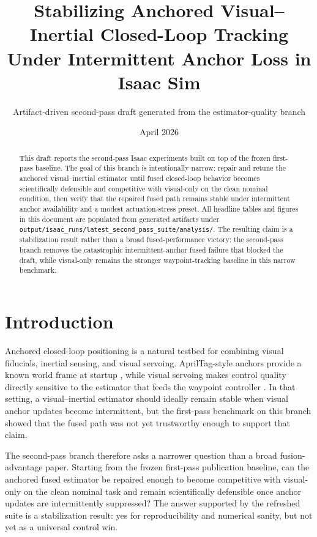 \documentclass[11pt]{article}
\title{Stabilizing Anchored Visual--Inertial Closed-Loop Tracking Under Intermittent Anchor Loss in Isaac Sim}
\author{Artifact-driven second-pass draft generated from the estimator-quality branch}
\date{April 2026}
\begin{document}
\maketitle

\begin{abstract}
This draft reports the second-pass Isaac experiments built on top of the frozen first-pass baseline. The goal of this branch is intentionally narrow: repair and retune the anchored visual--inertial estimator until fused closed-loop behavior becomes scientifically defensible and competitive with visual-only on the clean nominal condition, then verify that the repaired fused path remains stable under intermittent anchor availability and a modest actuation-stress preset. All headline tables and figures in this document are populated from generated artifacts under \texttt{output/isaac\_runs/latest\_second\_pass\_suite/analysis/}. The resulting claim is a stabilization result rather than a broad fused-performance victory: the second-pass branch removes the catastrophic intermittent-anchor fused failure that blocked the draft, while visual-only remains the stronger waypoint-tracking baseline in this narrow benchmark.
\end{abstract}

\section{Introduction}
Anchored closed-loop positioning is a natural testbed for combining visual fiducials, inertial sensing, and visual servoing. AprilTag-style anchors provide a known world frame at startup \cite{olson2011apriltag,wang2016apriltag2}, while visual servoing makes control quality directly sensitive to the estimator that feeds the waypoint controller \cite{chaumette2006part1,chaumette2007part2}. In that setting, a visual--inertial estimator should ideally remain stable when visual anchor updates become intermittent, but the first-pass benchmark on this branch showed that the fused path was not yet trustworthy enough to support that claim.

The second-pass branch therefore asks a narrower question than a broad fusion-advantage paper. Starting from the frozen first-pass publication baseline, can the anchored fused estimator be repaired enough to become competitive with visual-only on the clean nominal task and remain scientifically defensible once anchor updates are intermittently suppressed? The answer supported by the refreshed suite is a stabilization result: yes for reproducibility and numerical sanity, but not yet as a universal control win.
\end{document}
